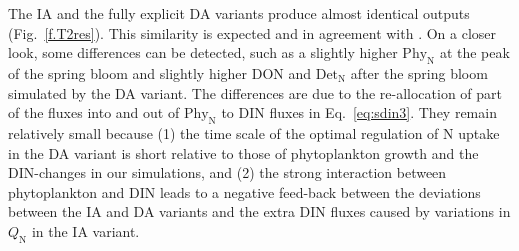 \documentclass[gmd, manuscript]{copernicus}
\newcommand{\onur}[1]{\textcolor{blue}{\{Onur: #1\}}}
\begin{document}
% 


The IA and the fully explicit DA variants produce almost identical outputs (Fig.~\ref{f.T2res}). This similarity is expected and in agreement with \citet{Ward2017}. On a closer look, some differences can be detected, such as a slightly higher $\text{Phy}_{\text{N}}$ at the peak of the spring bloom and slightly higher DON and $\text{Det}_{\text{N}}$ after the spring bloom simulated by the DA variant.  The differences are due to the re-allocation of part of the fluxes into and out of $\text{Phy}_{\text{N}}$ to DIN fluxes in Eq.~\eqref{eq:sdin3}.  They remain relatively small because (1) the time scale of the optimal regulation of N uptake in the DA variant is short relative to those of phytoplankton growth and the DIN-changes in our simulations, and (2) the strong interaction between phytoplankton and DIN leads to a negative feed-back between the deviations between the IA and DA variants and the extra DIN fluxes caused by variations in $Q_{\text{N}}$ in the IA variant.
\end{document}
